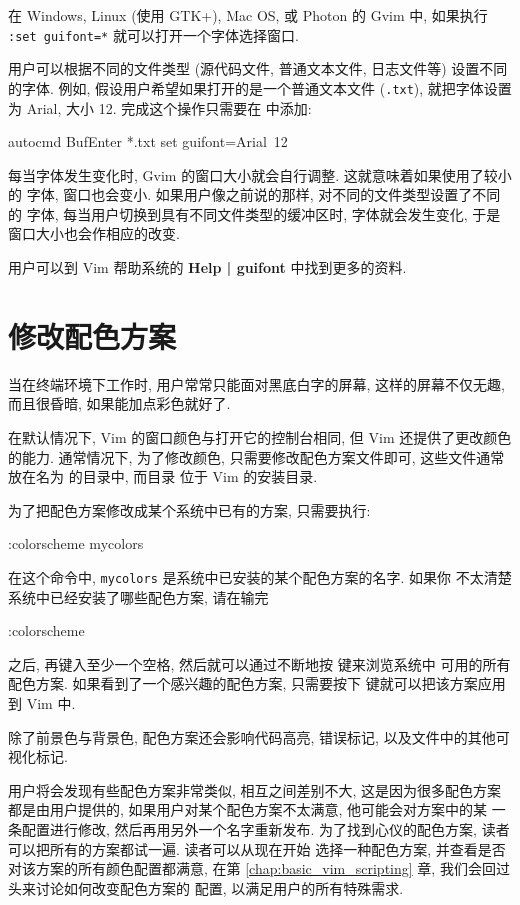 \begin{warning}
    在 Windows, Linux (使用 GTK+), Mac OS, 或 Photon 的 Gvim 中,
    如果执行 \texttt{:set guifont=*} 就可以打开一个字体选择窗口.
\end{warning}

用户可以根据不同的文件类型 (源代码文件, 普通文本文件, 日志文件等) 
设置不同的字体. 例如, 假设用户希望如果打开的是一个普通文本文件
(\texttt{.txt}),
就把字体设置为 Arial, 大小 12. 完成这个操作只需要在  中添加:
\begin{vimcmd}
autocmd BufEnter *.txt set guifont=Arial\ 12
\end{vimcmd}
每当字体发生变化时, Gvim 的窗口大小就会自行调整. 这就意味着如果使用了较小的
字体, 窗口也会变小. 如果用户像之前说的那样, 对不同的文件类型设置了不同的
字体, 每当用户切换到具有不同文件类型的缓冲区时, 字体就会发生变化, 于是
窗口大小也会作相应的改变.
\begin{warning}
    用户可以到 Vim 帮助系统的 \textbf{Help | guifont} 中找到更多的资料.
\end{warning}
\section{修改配色方案}
\label{sec:changing_color_scheme}
当在终端环境下工作时, 用户常常只能面对黑底白字的屏幕, 这样的屏幕不仅无趣,
而且很昏暗, 如果能加点彩色就好了.

在默认情况下, Vim 的窗口颜色与打开它的控制台相同, 但 Vim 还提供了更改颜色
的能力. 通常情况下, 为了修改颜色, 只需要修改配色方案文件即可, 这些文件通常
放在名为  的目录中, 而目录  位于 Vim 的安装目录.

为了把配色方案修改成某个系统中已有的方案, 只需要执行:
\begin{vimcmd}
:colorscheme mycolors
\end{vimcmd}
在这个命令中, \texttt{mycolors} 是系统中已安装的某个配色方案的名字. 如果你 
不太清楚系统中已经安装了哪些配色方案, 请在输完
\begin{vimcmd}
:colorscheme
\end{vimcmd}
之后, 再键入至少一个空格, 然后就可以通过不断地按  键来浏览系统中
可用的所有配色方案. 如果看到了一个感兴趣的配色方案, 只需要按下 
键就可以把该方案应用到 Vim 中.

除了前景色与背景色, 配色方案还会影响代码高亮, 错误标记, 以及文件中的其他可
视化标记.

用户将会发现有些配色方案非常类似, 相互之间差别不大, 这是因为很多配色方案
都是由用户提供的, 如果用户对某个配色方案不太满意, 他可能会对方案中的某
一条配置进行修改, 然后再用另外一个名字重新发布.
为了找到心仪的配色方案, 读者可以把所有的方案都试一遍. 读者可以从现在开始
选择一种配色方案, 并查看是否对该方案的所有颜色配置都满意, 在第
\ref{chap:basic_vim_scripting} 章, 我们会回过头来讨论如何改变配色方案的
配置, 以满足用户的所有特殊需求.

